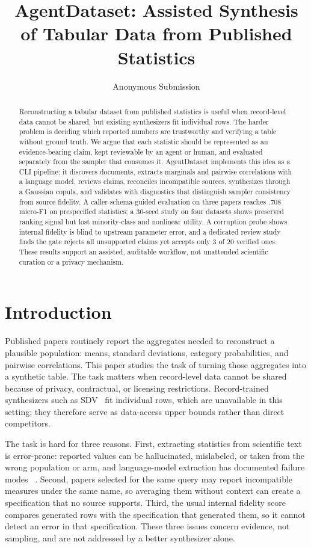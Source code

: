 \documentclass[letterpaper]{article}
\title{AgentDataset: Assisted Synthesis of Tabular Data from Published Statistics}
\author{Anonymous Submission}
\begin{document}
\maketitle

\begin{abstract}
Reconstructing a tabular dataset from published statistics is useful when record-level data
cannot be shared, but existing synthesizers fit individual rows. The harder problem is deciding
which reported numbers are trustworthy and verifying a table without ground truth. We argue that
each statistic should be represented as an evidence-bearing claim, kept reviewable by an agent or
human, and evaluated separately from the sampler that consumes it. AgentDataset implements this
idea as a CLI pipeline: it discovers documents, extracts marginals and pairwise correlations with
a language model, reviews claims, reconciles incompatible sources, synthesizes through a Gaussian
copula, and validates with diagnostics that distinguish sampler consistency from source fidelity.
A caller-schema-guided evaluation on three papers reaches .708 micro-F1 on prespecified
statistics; a 30-seed study on four datasets shows preserved ranking signal but lost
minority-class and nonlinear utility. A corruption probe shows internal fidelity is blind to upstream parameter
error, and a dedicated review study finds the gate rejects all unsupported claims yet accepts
only 3 of 20 verified ones. These results support an assisted, auditable workflow, not unattended
scientific curation or a privacy mechanism.
\end{abstract}

\section{Introduction}
\label{sec:intro}

Published papers routinely report the aggregates needed to reconstruct a plausible population:
means, standard deviations, category probabilities, and pairwise correlations. This paper studies
the task of turning those aggregates into a synthetic table. The task matters when record-level
data cannot be shared because of privacy, contractual, or licensing restrictions. Record-trained
synthesizers such as SDV~\citep{patki2016} fit individual rows, which are unavailable in this
setting; they therefore serve as data-access upper bounds rather than direct competitors.

The task is hard for three reasons. First, extracting statistics from scientific text is
error-prone: reported values can be hallucinated, mislabeled, or taken from the wrong population
or arm, and language-model extraction has documented failure modes
~\citep{nasar2018,liu2025,song2025,sror2026}. Second, papers selected for the same query may
report incompatible measures under the same name, so averaging them without context can create a
specification that no source supports. Third, the usual internal fidelity score compares
generated rows with the specification that generated them, so it cannot detect an error in that
specification. These three issues concern evidence, not sampling, and are not addressed by a
better synthesizer alone.
\end{document}
